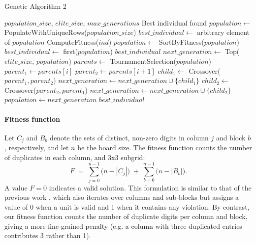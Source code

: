 \begin{algorithm}[H]
\caption{Genetic Algorithm 2}\label{alg:impl-2}
\begin{algorithmic}
\Require $population\_size$, $elite\_size$, $max\_generations$
\Ensure Best individual found
\State $population \gets$ PopulateWithUniqueRows($population\_size$)
\State $best\_individual \gets$ arbitrary element of $population$
    \State ComputeFitness($ind$)
  \EndFor
  \State $population \gets$ SortByFitness($population$) 
    \State $best\_individual \gets$ first($population$)
  \EndIf
    \State \Return $best\_individual$
  \EndIf
  \State $next\_generation \gets$ Top($elite\_size$, $population$)
  \State $parents \gets$ TournamentSelection($population$)
    \State $parent_1 \gets parents[i]$
    \State $parent_2 \gets parents[i+1]$
    \State $child_1 \gets$ Crossover($parent_1, parent_2$)
    \State $next\_generation \gets next\_generation \cup \{child_1\}$
      \State $child_2 \gets$ Crossover($parent_2, parent_1$)
      \State $next\_generation \gets next\_generation \cup \{child_2\}$
    \EndIf
  \EndFor
  \State $population \gets next\_generation$
\EndFor
\State \Return $best\_individual$
\end{algorithmic}
\end{algorithm}

\paragraph{Fitness function} Let \(C_j\) and \(B_b\) denote the sets of distinct, non-zero digits in column \(j\) and block \(b\), respectively, and let \(n\) be the board size. The fitness function counts the number of duplicates in each column, and 3x3 subgrid:
\[
F \;=\; \sum_{j=0}^{n-1} \bigl(n - |C_j|\bigr) \;+\; \sum_{b=0}^{n-1} \bigl(n - |B_b|\bigr).
\]
A value \(F=0\) indicates a valid solution. This formulation is similar to that of the previous work , which also iterates over columns and sub-blocks but assigns a value of 0 when a unit is valid and 1 when it contains any violation\cite{Wang2024}. By contrast, our fitness function counts the number of duplicate digits per column and block, giving a more fine-grained penalty (e.g. a column with three duplicated entries contributes 3 rather than 1).

